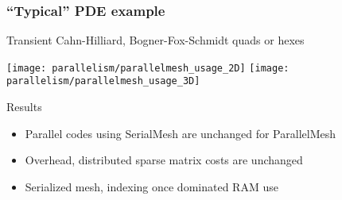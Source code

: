

\begin{frame}
\frametitle{``Typical'' PDE example}

Transient Cahn-Hilliard, Bogner-Fox-Schmidt quads or hexes

  \texttt{[image: parallelism/parallelmesh\_usage\_2D]}
  \texttt{[image: parallelism/parallelmesh\_usage\_3D]}

\begin{block}{Results}
\begin{itemize}
\item Parallel codes using SerialMesh are unchanged for ParallelMesh
\item Overhead, distributed sparse matrix costs are unchanged
\item Serialized mesh, indexing once dominated RAM use
\end{itemize}
\end{block}
\end{frame}


